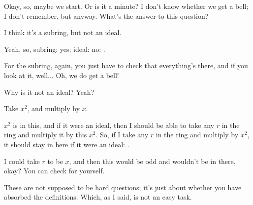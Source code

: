 \begin{speech}[00:45:05 - 00:45:20]
Okay, so, maybe we start. Or is it a minute? I don't know whether we get a bell; I don't remember, but anyway. What's the answer to this question?
\end{speech}

\begin{student}
I think it's a subring, but not an ideal.
\end{student}

\begin{speech}[00:45:24 - 00:45:44]
Yeah, so, subring: yes; ideal: no: .

For the subring, again, you just have to check that everything's there, and if you look at it, well... Oh, we do get a bell! 

Why is it not an ideal? Yeah?
\end{speech}

\begin{student}
Take $x^2$, and multiply by $x$.
\end{student}

\begin{speech}[00:45:48 - 00:46:21]
$x^2$ is in this,  and if it were an ideal, then I should be able to take any $r$ in the ring and multiply it by this $x^2$. So, if I take any $r$ in the ring and multiply by $x^2$, it should stay in here if it were an ideal: .

I could take $r$ to be $x$, and then this would be odd and wouldn't be in there, okay? You can check for yourself.

These are not supposed to be hard questions; it's just about whether you have absorbed the definitions. Which, as I said, is not an easy task.
\end{speech}

